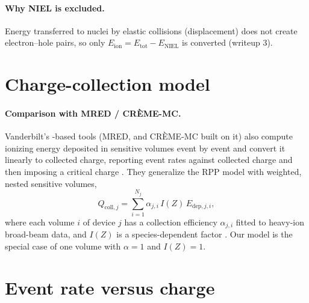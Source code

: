 \paragraph{Why NIEL is excluded.} Energy transferred to nuclei by elastic collisions (displacement) does not create electron--hole pairs, so only $E_\text{ion} = E_\text{tot} - E_\text{NIEL}$ is converted (writeup 3).

\section{Charge-collection model}




\paragraph{Comparison with MRED / CR\`EME-MC.} Vanderbilt's \gfour{}-based tools (MRED, and CR\`EME-MC built on it) also compute ionizing energy deposited in sensitive volumes event by event and convert it linearly to collected charge, reporting event rates against collected charge and then imposing a critical charge \citep{weller2010mred,sierawski2010creme}. They generalize the RPP model with weighted, nested sensitive volumes,
\[
  Q_{\text{coll},j} = \sum_{i=1}^{N_j} \alpha_{j,i}\, I(Z)\, E_{\text{dep},j,i},
\]
where each volume $i$ of device $j$ has a collection efficiency $\alpha_{j,i}$ fitted to heavy-ion broad-beam data, and $I(Z)$ is a species-dependent factor \citep{sierawski2010creme}. Our model is the special case of one volume with $\alpha=1$ and $I(Z)=1$.

\section{Event rate versus charge}

